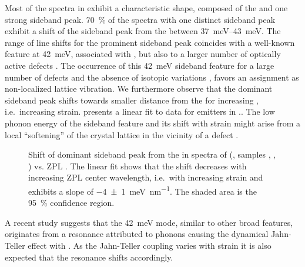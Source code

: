 		Most of the spectra in \vl exhibit a characteristic shape, composed of the \ZPL and one strong sideband peak.
		\SI{70}{\percent} of the \pl spectra with one distinct sideband peak exhibit a shift of the sideband peak from the \ZPL between \SIrange{37}{43}{meV}.
		The range of line shifts for the prominent sideband peak coincides with a well-known feature at \SI{42}{meV}, associated with \sivs \cite{Larkins1971,Sternschulte1994}, but also to a larger number of optically active defects \cite{Sternschulte1994}.
		The occurrence of this \SI{42}{meV} sideband feature for a large number of defects and the absence of isotopic variations \cite{Dietrich2014}, favors an assignment as non-localized lattice vibration.
		We furthermore observe that the dominant sideband peak shifts towards smaller distance from the \ZPL for increasing \ZPL \cwl, i.e.\ increasing strain.  presents a linear fit to data for emitters in \vl..
		The low phonon energy of the sideband feature and its shift with strain might arise from a local ``softening'' of the crystal lattice in the vicinity of a defect \cite{Sternschulte1994}.

		\begin{figure}[!htb]
			\centering
			\caption[Shift of dominant Side band peaks of \sivs]{Shift of dominant sideband peak from the \ZPL in spectra of \sivs (\vl, samples \insituF, \insituS, \insituH) vs. ZPL \cwl. The linear fit shows that the shift decreases with increasing ZPL center wavelength, i.e.\ with increasing strain and exhibits a slope of \SI[separate-uncertainty]{-4\pm1}{\milli\electronvolt\per\nano\meter}. The shaded area is the \SI{95}{\percent} confidence region.}
			\label{fig::sideband_fit}
		\end{figure}

		A recent study \cite{Londero2016} suggests that the \SI{42}{meV} mode, similar to other broad \psb features, originates from a resonance attributed to phonons causing the dynamical Jahn-Teller effect with \sivs \cite{Fu2009}.
		As the Jahn-Teller coupling varies with strain it is also expected that the resonance shifts accordingly.
		
